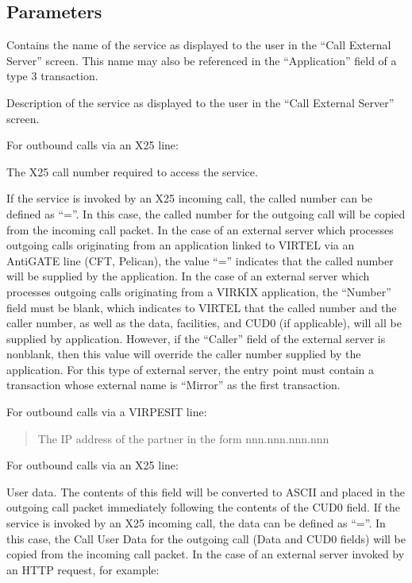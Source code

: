 \documentclass[letterpaper,10pt,english]{sphinxmanual}
\begin{document}
\subsection{Parameters}
\label{\detokenize{connectivity_guide:index-134}}\label{\detokenize{connectivity_guide:id71}}\begin{description}
\sphinxAtStartPar
Contains the name of the service as displayed to the user in the “Call External Server” screen. This name may also be referenced in the “Application” field of a type 3 transaction.

\sphinxAtStartPar
Description of the service as displayed to the user in the “Call External Server” screen.

\sphinxAtStartPar
For outbound calls via an X25 line:

\sphinxAtStartPar
The X25 call number required to access the service.

\sphinxAtStartPar
If the service is invoked by an X25 incoming call, the called number can be defined as “=”. In this case, the called number for the outgoing call will be copied from the incoming call packet. In the case of an external server which processes outgoing calls originating from an application linked to VIRTEL via an AntiGATE line (CFT, Pelican), the value “=” indicates that the called number will be supplied by the application. In the case of an external server which processes outgoing calls originating from a VIRKIX application, the “Number” field must be blank, which indicates to VIRTEL that the called number and the caller number, as well as the data, facilities, and CUD0 (if applicable), will all be supplied by application. However, if the “Caller” field of the external server is non\sphinxhyphen{}blank, then this value will override the caller number supplied by the application. For this type of external server, the entry point must contain a transaction whose external name is “Mirror” as the first transaction.

\sphinxAtStartPar
For outbound calls via a VIRPESIT line:
\begin{quote}

\sphinxAtStartPar
The IP address of the partner in the form nnn.nnn.nnn.nnn
\end{quote}

\sphinxAtStartPar
For outbound calls via an X25 line:

\sphinxAtStartPar
User data. The contents of this field will be converted to ASCII and placed in the outgoing call packet immediately following the contents of the CUD0 field. If the service is invoked by an X25 incoming call, the data can be defined as “=”. In this case, the Call User Data for the outgoing call (Data and CUD0 fields) will be copied from the incoming call packet. In the case of an external server invoked by an HTTP request, for example:

\end{description}
\end{document}
